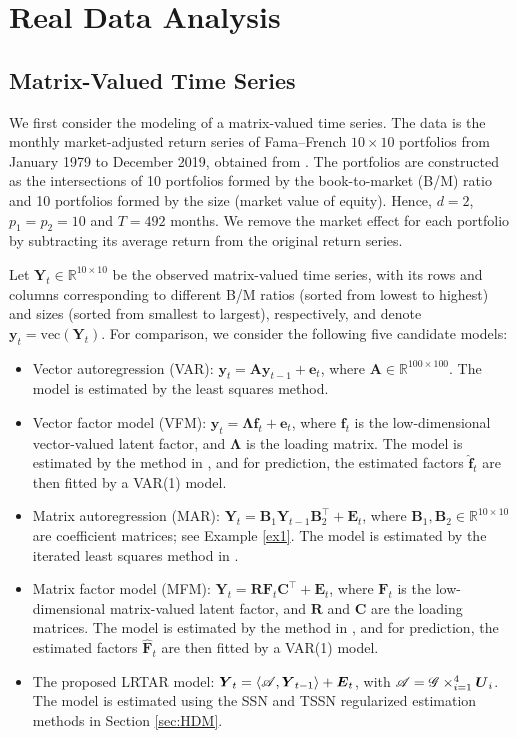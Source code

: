 \documentclass[12pt]{article}
\newcommand{\bm}{\boldsymbol}
\newcommand{\cm}[1]{\mbox{\boldmath$\mathscr{#1}$}}
\begin{document}
\section{Real Data Analysis}\label{sec:realdata}

\subsection{Matrix-Valued Time Series}\label{subsec:matrix_valued}
We first consider the modeling of a matrix-valued time series. The data is the monthly market-adjusted return  series  of Fama--French
$10\times10$ portfolios from January 1979 to December 2019, obtained from \cite{French_data}. The portfolios are constructed as the intersections of 10 portfolios formed by the book-to-market (B/M) ratio and 10 portfolios  formed by the size (market value of equity).   
Hence, $d=2$, $p_1=p_2=10$ and $T=492$ months.  We remove the market effect for each portfolio by subtracting its average return from the original return series.
  
Let $\bm{Y}_t\in\mathbb{R}^{10\times 10}$ be  the observed matrix-valued time series, with its rows and columns corresponding to different  B/M ratios (sorted from lowest to highest) and sizes (sorted from smallest to largest), respectively, and denote $\bm{y}_t=\text{vec}(\bm{Y}_t)$.
For comparison, we consider the following five candidate models:
\begin{itemize}
	\item Vector autoregression (VAR): $\bm{y}_t=\bm{A}\bm{y}_{t-1}+\bm{e}_t$, where $\bm{A}\in\mathbb{R}^{100\times 100}$. The model is estimated by the least squares method.
	
	\item Vector factor model (VFM): $\bm{y}_t=\bm{\Lambda}\bm{f}_{t}+\bm{e}_t$, where  $\bm{f}_{t}$ is the low-dimensional vector-valued latent factor, and $\bm{\Lambda}$ is the loading matrix. The model is estimated by the method in \cite{lam2012factor}, and for prediction, the estimated factors $\bm{\widehat{f}}_{t}$ are then fitted by a VAR(1) model.
	
	\item Matrix autoregression (MAR): $\bm{Y}_t=\bm{B}_1\bm{Y}_{t-1}\bm{B}_2^\top+\bm{E}_t$, where $\bm{B}_1, \bm{B}_2 \in\mathbb{R}^{10\times 10}$ are coefficient matrices; see Example \ref{ex1}. The model is estimated by the iterated least squares  method in \cite{chen2018autoregressive}.
	
	\item Matrix factor model (MFM): $\bm{Y}_t=\bm{R}\bm{F}_{t}\bm{C}^\top+\bm{E}_t$, where $\bm{F}_{t}$ is the low-dimensional matrix-valued latent factor, and $\bm{R}$ and $\bm{C}$ are the loading matrices. The model is estimated by the method in \cite{wang2016factor}, and for prediction, the estimated factors $\bm{\widehat{F}}_{t}$ are then fitted by a VAR(1) model.
	
	\item The proposed LRTAR model: $\bm{Y}_t=\langle\cm{A},\bm{Y}_{t-1}\rangle+\bm{E}_t$, with $\cm{A}=\cm{G}\times_{i=1}^{4}\bm{U}_i$. The model is estimated using the SSN and TSSN regularized estimation methods in Section \ref{sec:HDM}.
\end{itemize}
\end{document}
